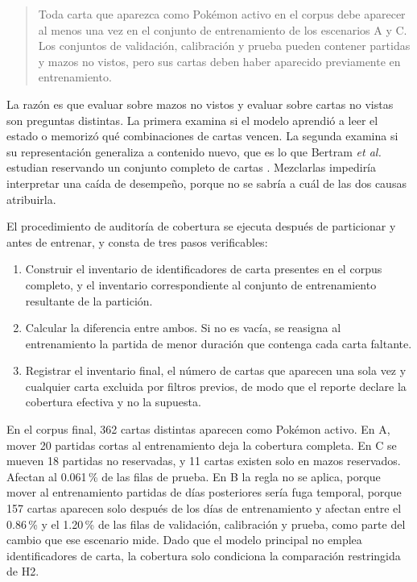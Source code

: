 \begin{quote}
Toda carta que aparezca como Pok\'emon activo en el corpus debe aparecer al
menos una vez en el conjunto de entrenamiento de los escenarios A y C. Los
conjuntos de validación, calibración y prueba pueden contener partidas y
mazos no vistos, pero sus cartas deben haber aparecido previamente en
entrenamiento.
\end{quote}

La razón es que evaluar sobre mazos no vistos y evaluar sobre cartas no
vistas son preguntas distintas. La primera examina si el modelo aprendió a
leer el estado o memorizó qué combinaciones de cartas vencen. La segunda
examina si su representación generaliza a contenido nuevo, que es lo que
Bertram \textit{et al.} estudian reservando un conjunto completo de cartas
\cite{bertram_cardrepresentations_2024}. Mezclarlas impediría interpretar
una caída de desempeño, porque no se sabría a cuál de las dos causas
atribuirla.

El procedimiento de auditoría de cobertura se ejecuta después de particionar
y antes de entrenar, y consta de tres pasos verificables:

\begin{enumerate}
  \item Construir el inventario de identificadores de carta presentes en el
        corpus completo, y el inventario correspondiente al conjunto de
        entrenamiento resultante de la partición.
  \item Calcular la diferencia entre ambos. Si no es vacía, se reasigna al
        entrenamiento la partida de menor duración que contenga cada carta
        faltante.
  \item Registrar el inventario final, el número de cartas que aparecen una
        sola vez y cualquier carta excluida por filtros previos, de modo que
        el reporte declare la cobertura efectiva y no la supuesta.
\end{enumerate}

En el corpus final, 362 cartas distintas aparecen como Pok\'emon activo. En
A, mover 20 partidas cortas al entrenamiento deja la cobertura completa. En
C se mueven 18 partidas no reservadas, y 11 cartas existen solo en mazos
reservados. Afectan al 0.061\,\% de las filas de prueba. En B la regla no se
aplica, porque mover al entrenamiento partidas de días posteriores sería
fuga temporal, porque 157 cartas aparecen solo después de los días de
entrenamiento y afectan entre el 0.86\,\% y el 1.20\,\% de las filas de
validación, calibración y prueba, como parte del cambio que ese escenario
mide. Dado que el modelo principal no emplea identificadores de carta, la
cobertura solo condiciona la comparación restringida de H2.

